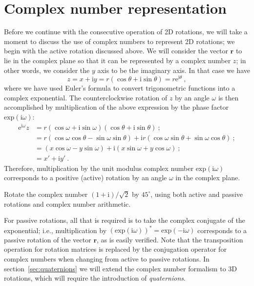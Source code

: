 \section{Complex number representation\label{ref:complex2D}}
Before we continue with the consecutive operation of 2D rotations, we will take a moment to discuss the use of complex numbers to represent 2D rotations; we begin with the active rotation discussed above.  We will consider the vector $\mathbf{r}$ to lie in the complex plane so that it can be represented by a complex number $z$; in other words, we consider the $y$ axis to be the imaginary axis.  In that case we have 
\[
	z = x+\mathrm{i}y = r(\cos\theta+\mathrm{i}\sin\theta) = r \mathrm{e}^{\mathrm{i}\theta}\ ,
\]
where we have used Euler's formula to convert trigonometric functions into a complex exponential.  The counterclockwise rotation of $z$ by an angle $\omega$ is then accomplished by multiplication of the above expression by the phase factor $\text{exp}(\mathrm{i}\omega)$:
\begin{align*}
	\mathrm{e}^{\mathrm{i}\omega}z &=  r(\cos\omega+\mathrm{i}\sin\omega) (\cos\theta+\mathrm{i}\sin\theta)\ ; \\
	&=r(\cos\omega\cos\theta - \sin\omega\sin\theta) +\mathrm{i}r(\cos\omega\sin\theta+\sin\omega\cos\theta)\ ; \\
	&= (x\cos\omega - y\sin\omega) + \mathrm{i} (x\sin\omega + y\cos\omega)\ ; \\
	& = x' + \mathrm{i} y'\ .
\end{align*}
Therefore, multiplication by the unit modulus complex number $\text{exp}(\mathrm{i}\omega)$ corresponds to a positive (active) rotation by an angle $\omega$ in the complex plane.

\begin{exercise}
Rotate the complex number $(1+\mathrm{i})/\sqrt{2}$ by $45^{\circ}$, using both active and passive rotations and complex number arithmetic.
\end{exercise}

For passive rotations, all that is required is to take the complex conjugate of the exponential; i.e., multiplication by $\left(\text{exp}(\mathrm{i}\omega)\right)^{\ast}=\text{exp}(-\mathrm{i}\omega)$ corresponds to a passive rotation of the vector $\mathbf{r}$, as is easily verified.  Note that the transposition operation for rotation matrices is replaced by the conjugation operator for complex numbers when changing from active to passive rotations.  In section~\ref{sec:quaternions} we will extend the complex number formalism to 3D rotations, which will require the introduction of  \textit{quaternions}.

